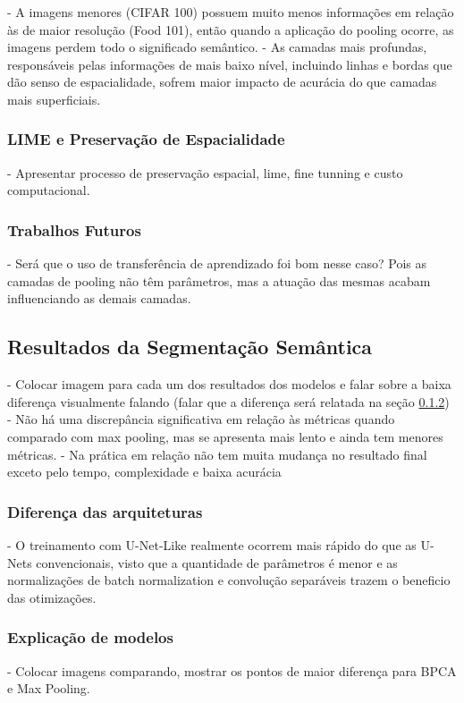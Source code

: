 - A imagens menores (CIFAR 100) possuem muito menos informações em relação às de maior resolução (Food 101), então quando a aplicação do pooling ocorre, as imagens perdem todo o significado semântico.
- As camadas mais profundas, responsáveis pelas informações de mais baixo nível, incluindo linhas e bordas que dão senso de espacialidade, sofrem maior impacto de acurácia do que camadas mais superficiais.

\subsubsection{LIME e Preservação de Espacialidade}
\label{results:class:lime}
- Apresentar processo de preservação espacial, lime, fine tunning e custo computacional.

\subsubsection{Trabalhos Futuros}
\label{results:class:future}
- Será que o uso de transferência de aprendizado foi bom nesse caso? Pois as camadas de pooling não têm parâmetros, mas a atuação das mesmas acabam influenciando as demais camadas.


\subsection{Resultados da Segmentação Semântica}
\label{results:semantic}
- Colocar imagem para cada um dos resultados dos modelos e falar sobre a baixa diferença visualmente falando (falar que a diferença será relatada na seção \ref{results:semantic:xai})
- Não há uma discrepância significativa em relação às métricas quando comparado com max pooling, mas se apresenta mais lento e ainda tem menores métricas.
- Na prática em relação não tem muita mudança no resultado final exceto pelo tempo, complexidade e baixa acurácia

\subsubsection{Diferença das arquiteturas}
\label{results:semantic:arch}
- O treinamento com U-Net-Like realmente ocorrem mais rápido do que as U-Nets convencionais, visto que a quantidade de parâmetros é menor e as normalizações de batch normalization e convolução separáveis trazem o beneficio das otimizações.

\subsubsection{Explicação de modelos}
\label{results:semantic:xai}
- Colocar imagens comparando, mostrar os pontos de maior diferença para BPCA e Max Pooling.

